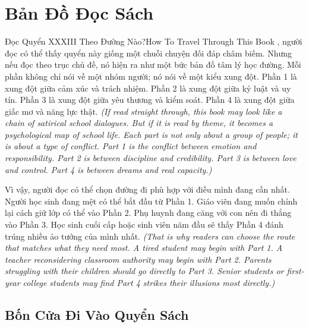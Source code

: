 \chapter*{Bản Đồ Đọc Sách}

\begin{truyen}{Đọc Quyển XXXIII Theo Đường Nào?}{How To Travel Through This Book}
, người đọc có thể thấy quyển này giống một chuỗi chuyện đối đáp châm biếm. Nhưng nếu đọc theo trục chủ đề, nó hiện ra như một bức bản đồ tâm lý học đường. Mỗi phần không chỉ nói về một nhóm người; nó nói về một kiểu xung đột. Phần 1 là xung đột giữa cảm xúc và trách nhiệm. Phần 2 là xung đột giữa kỷ luật và uy tín. Phần 3 là xung đột giữa yêu thương và kiểm soát. Phần 4 là xung đột giữa giấc mơ và năng lực thật.
\textit{(If read straight through, this book may look like a chain of satirical school dialogues. But if it is read by theme, it becomes a psychological map of school life. Each part is not only about a group of people; it is about a type of conflict. Part 1 is the conflict between emotion and responsibility. Part 2 is between discipline and credibility. Part 3 is between love and control. Part 4 is between dreams and real capacity.)}

Vì vậy, người đọc có thể chọn đường đi phù hợp với điều mình đang cần nhất. Người học sinh đang mệt có thể bắt đầu từ Phần 1. Giáo viên đang muốn chỉnh lại cách giữ lớp có thể vào Phần 2. Phụ huynh đang căng với con nên đi thẳng vào Phần 3. Học sinh cuối cấp hoặc sinh viên năm đầu sẽ thấy Phần 4 đánh trúng nhiều ảo tưởng của mình nhất.
\textit{(That is why readers can choose the route that matches what they need most. A tired student may begin with Part 1. A teacher reconsidering classroom authority may begin with Part 2. Parents struggling with their children should go directly to Part 3. Senior students or first-year college students may find Part 4 strikes their illusions most directly.)}
\end{truyen}

\section*{Bốn Cửa Đi Vào Quyển Sách}

